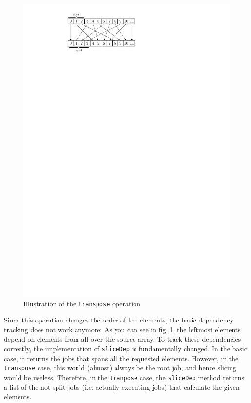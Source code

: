 \documentclass[runningheads,a4paper,fleqn]{llncs}
\begin{document}
\begin{figure}
\centering
\includegraphics{transpose}
\caption{Illustration of the \texttt{transpose} operation}
\label{fig:transpose}
\end{figure}

Since this operation changes the order of the elements, the basic
dependency tracking does not work anymore: As you can see in
fig~\ref{fig:transpose}, the leftmost elements depend on elements from
all over the source array. To track these dependencies correctly, the
implementation of \texttt{sliceDep} is fundamentally changed. In the
basic case, it returns the jobs that spans all the requested
elements. However, in the \texttt{transpose} case, this would (almost)
always be the root job, and hence slicing would be useless. Therefore,
in the \texttt{tranpose} case, the \texttt{sliceDep} method returns a
list of the not-split jobs (i.e. actually executing jobs) that
calculate the given elements.
\end{document}
